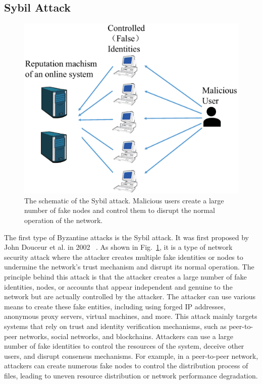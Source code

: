 \documentclass[pdflatex,sn-mathphys-num]{sn-jnl}%
\theoremstyle{thmstyleone}%
\theoremstyle{thmstyletwo}%
\theoremstyle{thmstylethree}%
\begin{document}
\subsection{Sybil Attack}
\begin{figure}[h]
	\centering
	\includegraphics[width=1.0\linewidth,height=3.5in]{output/fig14.eps}
	\caption{The schematic of the Sybil attack. Malicious users create a
		large number of fake nodes and control them to disrupt the normal
		operation of the network.}
	\label{fig14}
\end{figure}

The first type of Byzantine attacks is the Sybil attack.
It was first proposed by John Douceur et al. in 2002~\cite{douceur2002sybil}
. As shown in Fig.~\ref{fig14}, it is a type of network security
attack where the attacker creates multiple fake identities
or nodes to undermine the network's trust mechanism and
disrupt its normal operation. The principle behind this
attack is that the attacker creates a large number of fake
identities, nodes, or accounts that appear independent and
genuine to the network but are actually controlled by the
attacker. The attacker can use various means to create
these fake entities, including using forged IP addresses,
anonymous proxy servers, virtual machines, and more.
This attack mainly targets systems that rely on trust
and identity verification mechanisms, such as
peer-to-peer networks, social networks, and blockchains. Attackers
can use a large number of fake identities to control the
resources of the system, deceive other users, and disrupt
consensus mechanisms. For example, in a peer-to-peer
network, attackers can create numerous fake nodes to
control the distribution process of files, leading to uneven
resource distribution or network performance degradation.
\end{document}
